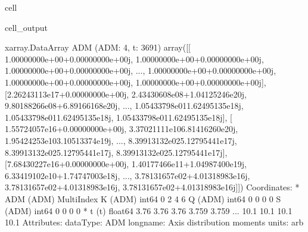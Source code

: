\documentclass[letterpaper,table,10pt,english]{jupyterBook}
\begin{document}
\begin{sphinxuseclass}{cell}
\begin{sphinxVerbatimOutput}
\begin{sphinxuseclass}{cell_output}
\begin{sphinxVerbatim}[commandchars=\\\{\}]
\PYGZlt{}xarray.DataArray \PYGZsq{}ADM\PYGZsq{} (ADM: 4, t: 3691)\PYGZgt{}
array([[ 1.00000000e+00+0.00000000e+00j,  1.00000000e+00+0.00000000e+00j,
         1.00000000e+00+0.00000000e+00j, ...,
         1.00000000e+00+0.00000000e+00j,  1.00000000e+00+0.00000000e+00j,
         1.00000000e+00+0.00000000e+00j],
       [\PYGZhy{}2.26243113e\PYGZhy{}17+0.00000000e+00j,  2.43430608e\PYGZhy{}08+1.04125246e\PYGZhy{}20j,
         9.80188266e\PYGZhy{}08+6.89166168e\PYGZhy{}20j, ...,
         1.05433798e\PYGZhy{}01\PYGZhy{}1.62495135e\PYGZhy{}18j,  1.05433798e\PYGZhy{}01\PYGZhy{}1.62495135e\PYGZhy{}18j,
         1.05433798e\PYGZhy{}01\PYGZhy{}1.62495135e\PYGZhy{}18j],
       [ 1.55724057e\PYGZhy{}16+0.00000000e+00j, \PYGZhy{}3.37021111e\PYGZhy{}10\PYGZhy{}6.81416260e\PYGZhy{}20j,
         1.95424253e\PYGZhy{}10\PYGZhy{}3.10513374e\PYGZhy{}19j, ...,
         8.39913132e\PYGZhy{}02\PYGZhy{}5.12795441e\PYGZhy{}17j,  8.39913132e\PYGZhy{}02\PYGZhy{}5.12795441e\PYGZhy{}17j,
         8.39913132e\PYGZhy{}02\PYGZhy{}5.12795441e\PYGZhy{}17j],
       [\PYGZhy{}7.68430227e\PYGZhy{}16+0.00000000e+00j, \PYGZhy{}1.40177466e\PYGZhy{}11+1.04987400e\PYGZhy{}19j,
         6.33419102e\PYGZhy{}10+1.74747003e\PYGZhy{}18j, ...,
         3.78131657e\PYGZhy{}02+4.01318983e\PYGZhy{}16j,  3.78131657e\PYGZhy{}02+4.01318983e\PYGZhy{}16j,
         3.78131657e\PYGZhy{}02+4.01318983e\PYGZhy{}16j]])
Coordinates:
  * ADM      (ADM) MultiIndex
  \PYGZhy{} K        (ADM) int64 0 2 4 6
  \PYGZhy{} Q        (ADM) int64 0 0 0 0
  \PYGZhy{} S        (ADM) int64 0 0 0 0
  * t        (t) float64 \PYGZhy{}3.76 \PYGZhy{}3.76 \PYGZhy{}3.76 \PYGZhy{}3.759 \PYGZhy{}3.759 ... 10.1 10.1 10.1 10.1
Attributes:
    dataType:   ADM
    long\PYGZus{}name:  Axis distribution moments
    units:      arb
\end{sphinxVerbatim}

\end{sphinxuseclass}\end{sphinxVerbatimOutput}

\end{sphinxuseclass}
\end{document}
